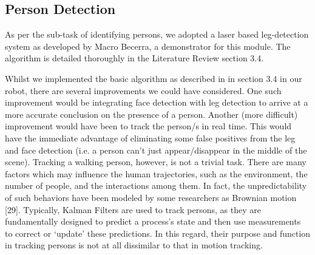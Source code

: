 \documentclass{article}
\begin{document}
	\subsection{Person Detection}
	As per the sub-task of identifying persons, we adopted a laser based leg-detection system as developed by Macro Becerra, a demonstrator for this module. The algorithm is detailed thoroughly in the Literature Review section 3.4.

Whilst we implemented the basic algorithm as described in in section 3.4 in our robot, there are several improvements we could have considered. One such improvement would be integrating face detection with leg detection to arrive at a more accurate conclusion on the presence of a person. Another (more difficult) improvement would have been to track the person/s in real time. This would have the immediate advantage of eliminating some false positives from the leg and face detection (i.e. a person can't just appear/disappear in the middle of the scene). Tracking a walking person, however, is not a trivial task. There are many factors which may influence the human trajectories, such as the environment, the number of people, and the interactions among them. In fact, the unpredictability of such behaviors have been modeled by some researchers as Brownian motion [29]. Typically, Kalman Filters are used to track persons, as they are fundamentally designed to predict a process’s state and then use measurements to correct or ‘update’ these predictions. In this regard, their purpose and function in tracking persons is not at all dissimilar to that in motion tracking.
\end{document}
